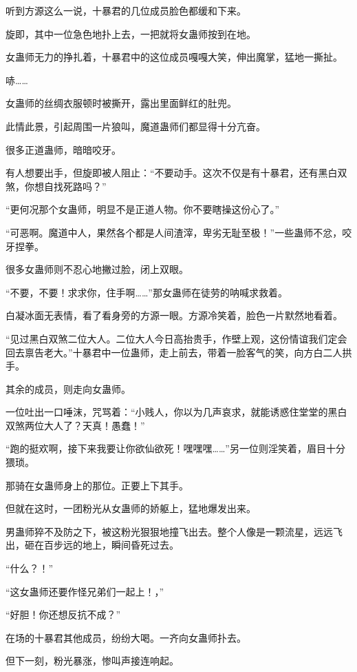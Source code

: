 
\begin{this_body}

听到方源这么一说，十暴君的几位成员脸色都缓和下来。

旋即，其中一位急色地扑上去，一把就将女蛊师按到在地。

女蛊师无力的挣扎着，十暴君中的这位成员嘎嘎大笑，伸出魔掌，猛地一撕扯。

哧……

女蛊师的丝绸衣服顿时被撕开，露出里面鲜红的肚兜。

此情此景，引起周围一片狼叫，魔道蛊师们都显得十分亢奋。

很多正道蛊师，暗暗咬牙。

有人想要出手，但旋即被人阻止：“不要动手。这次不仅是有十暴君，还有黑白双煞，你想自找死路吗？”

“更何况那个女蛊师，明显不是正道人物。你不要瞎操这份心了。”

“可恶啊。魔道中人，果然各个都是人间渣滓，卑劣无耻至极！”一些蛊师不忿，咬牙捏拳。

很多女蛊师则不忍心地撇过脸，闭上双眼。

“不要，不要！求求你，住手啊……”那女蛊师在徒劳的呐喊求救着。

白凝冰面无表情，看了看身旁的方源一眼。方源冷笑着，脸色一片默然地看着。

“见过黑白双煞二位大人。二位大人今日高抬贵手，作壁上观，这份情谊我们定会回去禀告老大。”十暴君中一位蛊师，走上前去，带着一脸客气的笑，向方白二人拱手。

其余的成员，则走向女蛊师。

一位吐出一口唾沫，咒骂着：“小贱人，你以为几声哀求，就能诱惑住堂堂的黑白双煞两位大人了？天真！愚蠢！”

“跑的挺欢啊，接下来我要让你欲仙欲死！嘿嘿嘿……”另一位则淫笑着，眉目十分猥琐。

那骑在女蛊师身上的那位。正要上下其手。

但就在这时，一团粉光从女蛊师的娇躯上，猛地爆发出来。

男蛊师猝不及防之下，被这粉光狠狠地撞飞出去。整个人像是一颗流星，远远飞出，砸在百步远的地上，瞬间昏死过去。

“什么？！”

“这女蛊师还要作怪兄弟们一起上！，”

“好胆！你还想反抗不成？”

在场的十暴君其他成员，纷纷大喝。一齐向女蛊师扑去。

但下一刻，粉光暴涨，惨叫声接连响起。


\end{this_body}
